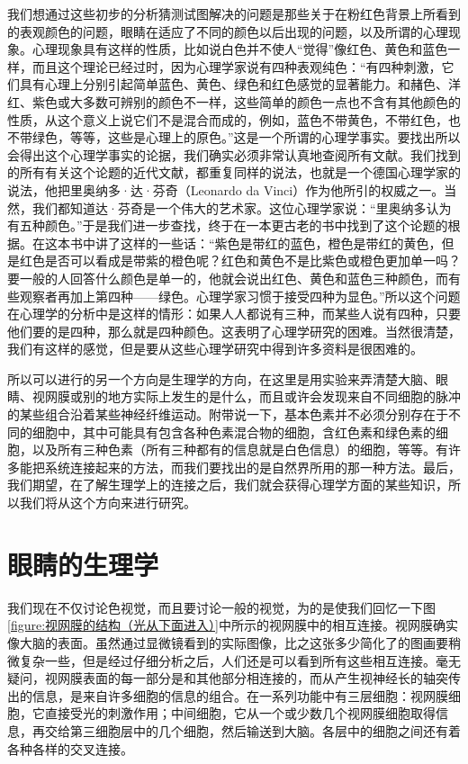 我们想通过这些初步的分析猜测试图解决的问题是那些关于在粉红色背景上所看到的表观颜色的问题，眼睛在适应了不同的颜色以后出现的问题，以及所谓的心理现象。心理现象具有这样的性质，比如说白色并不使人“觉得”像红色、黄色和蓝色一样，而且这个理论已经过时，因为心理学家说有四种表观纯色：“有四种刺激，它们具有心理上分别引起简单蓝色、黄色、绿色和红色感觉的显著能力。和赭色、洋红、紫色或大多数可辨别的颜色不一样，这些简单的颜色一点也不含有其他颜色的性质，从这个意义上说它们不是混合而成的，例如，蓝色不带黄色，不带红色，也不带绿色，等等，这些是心理上的原色。”这是一个所谓的心理学事实。要找出所以会得出这个心理学事实的论据，我们确实必须非常认真地查阅所有文献。我们找到的所有有关这个论题的近代文献，都重复同样的说法，也就是一个德国心理学家的说法，他把里奥纳多·达·芬奇（Leonardo da Vinci）作为他所引的权威之一。当然，我们都知道达·芬奇是一个伟大的艺术家。这位心理学家说：“里奥纳多认为有五种颜色。”于是我们进一步查找，终于在一本更古老的书中找到了这个论题的根据。在这本书中讲了这样的一些话：“紫色是带红的蓝色，橙色是带红的黄色，但是红色是否可以看成是带紫的橙色呢？红色和黄色不是比紫色或橙色更加单一吗？要一般的人回答什么颜色是单一的，他就会说出红色、黄色和蓝色三种颜色，而有些观察者再加上第四种——绿色。心理学家习惯于接受四种为显色。”所以这个问题在心理学的分析中是这样的情形：如果人人都说有三种，而某些人说有四种，只要他们要的是四种，那么就是四种颜色。这表明了心理学研究的困难。当然很清楚，我们有这样的感觉，但是要从这些心理学研究中得到许多资料是很困难的。

所以可以进行的另一个方向是生理学的方向，在这里是用实验来弄清楚大脑、眼睛、视网膜或别的地方实际上发生的是什么，而且或许会发现来自不同细胞的脉冲的某些组合沿着某些神经纤维运动。附带说一下，基本色素并不必须分别存在于不同的细胞中，其中可能具有包含各种色素混合物的细胞，含红色素和绿色素的细胞，以及所有三种色素（所有三种都有的信息就是白色信息）的细胞，等等。有许多能把系统连接起来的方法，而我们要找出的是自然界所用的那一种方法。最后，我们期望，在了解生理学上的连接之后，我们就会获得心理学方面的某些知识，所以我们将从这个方向来进行研究。

\section{眼睛的生理学}

我们现在不仅讨论色视觉，而且要讨论一般的视觉，为的是使我们回忆一下图\ref{figure:视网膜的结构（光从下面进入）}中所示的视网膜中的相互连接。视网膜确实像大脑的表面。虽然通过显微镜看到的实际图像，比之这张多少简化了的图画要稍微复杂一些，但是经过仔细分析之后，人们还是可以看到所有这些相互连接。毫无疑问，视网膜表面的每一部分是和其他部分相连接的，而从产生视神经长的轴突传出的信息，是来自许多细胞的信息的组合。在一系列功能中有三层细胞：视网膜细胞，它直接受光的刺激作用；中间细胞，它从一个或少数几个视网膜细胞取得信息，再交给第三细胞层中的几个细胞，然后输送到大脑。各层中的细胞之间还有着各种各样的交叉连接。

